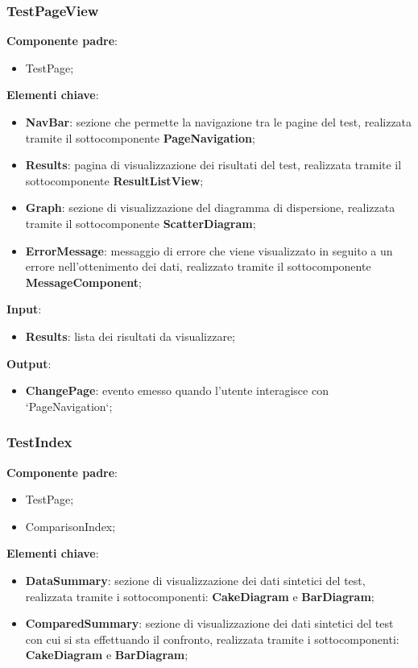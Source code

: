 \subsubsection{TestPageView}
\textbf{Componente padre}:
\begin{itemize}
    \item TestPage;
\end{itemize}
\textbf{Elementi chiave}:
\begin{itemize}
    \item \textbf{NavBar}: sezione che permette la navigazione tra le pagine del test, realizzata tramite il sottocomponente \textbf{PageNavigation};
    \item \textbf{Results}: pagina di visualizzazione dei risultati del test, realizzata tramite il sottocomponente \textbf{ResultListView};
    \item \textbf{Graph}: sezione di visualizzazione del diagramma di dispersione, realizzata tramite il sottocomponente \textbf{ScatterDiagram};
    \item \textbf{ErrorMessage}: messaggio di errore che viene visualizzato in seguito a un errore nell'ottenimento dei dati, realizzato tramite il sottocomponente \textbf{MessageComponent};
\end{itemize}
\textbf{Input}:
\begin{itemize}
    \item \textbf{Results}: lista dei risultati da visualizzare;
\end{itemize}
\textbf{Output}:
\begin{itemize}
    \item \textbf{ChangePage}: evento emesso quando l'utente interagisce con `PageNavigation`;
\end{itemize}
\subsubsection{TestIndex}
\textbf{Componente padre}:
\begin{itemize}
    \item TestPage;
    \item ComparisonIndex;
\end{itemize}
\textbf{Elementi chiave}:
\begin{itemize}
    \item \textbf{DataSummary}: sezione di visualizzazione dei dati sintetici del test, realizzata tramite i sottocomponenti: \textbf{CakeDiagram} e \textbf{BarDiagram};
    \item \textbf{ComparedSummary}: sezione di visualizzazione dei dati sintetici del test con cui si sta effettuando il confronto, realizzata tramite i sottocomponenti: \textbf{CakeDiagram} e \textbf{BarDiagram};
\end{itemize}
